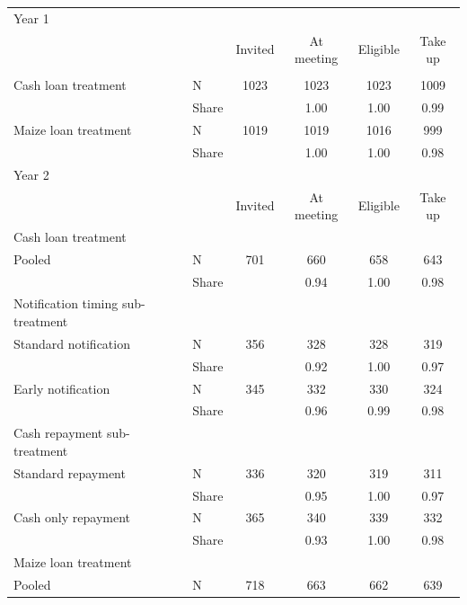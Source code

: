\begin{tabular}{ll cc cc}
\hline
Year 1 & & & & & \\ 
 & & Invited & At meeting & Eligible & Take up \\ 
 \\ 
Cash loan treatment & N & 1023     & 1023     & 1023     & 1009     \\ 
 & Share & & 1.00     & 1.00     & 0.99     \\
Maize loan treatment & N & 1019     & 1019     & 1016     & 999      \\ 
 & Share & & 1.00     & 1.00     & 0.98     \\
Year 2 & & & & & \\ 
& & Invited & At meeting & Eligible & Take up \\
Cash loan treatment & & & & & \\ 
 \hspace{1em} Pooled & N & 701      & 660      & 658      & 643      \\ 
 & Share & & 0.94     & 1.00     & 0.98     \\
\hspace{1em} Notification timing sub-treatment & & & & & \\ 
\hspace{2em} Standard notification & N & 356      & 328      & 328      & 319      \\ 
 & Share &  & 0.92     & 1.00     & 0.97     \\ 
\hspace{2em} Early notification & N & 345      & 332      & 330      & 324      \\ 
 & Share &  & 0.96     & 0.99     & 0.98     \\ 
\hspace{1em} Cash repayment sub-treatment & & & & & \\ 
\hspace{2em} Standard repayment & N & 336      & 320      & 319      & 311      \\ 
 & Share &  & 0.95     & 1.00     & 0.97     \\ 
\hspace{2em} Cash only repayment & N & 365      & 340      & 339      & 332      \\ 
 & Share &  & 0.93     & 1.00     & 0.98     \\ 
Maize loan treatment & & & & & \\ 
 \hspace{1em} Pooled & N & 718      & 663      & 662      & 639      \\ 

\end{tabular}
